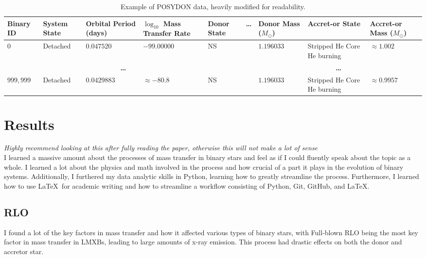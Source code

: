 \documentclass[12pt, a4paper]{article}
\begin{document}
    \begin{table}[H]
        \footnotesize
            \centering
            \begin{tabularx}{\textwidth}{||X|X|X|X|X||X||X|X|X||}
                \hline 
                \textbf{Binary ID} & 
                \textbf{System State} & 
                \textbf{Orbital Period (days)} & 
                \textbf{$\log_{10}$ Mass Transfer Rate} & 
                \textbf{Donor State} & 
                \textbf{\ldots}&
                \textbf{Donor Mass} ($M_\odot$) & 
                \textbf{Accret-or State} & 
                \textbf{Accret-or Mass} ($M_\odot$) \\
                \hline \hline
                $0$ & Detached & $0.047520$ & $-99.00000$ & NS & & $1.196033$ & Stripped He Core He burning & $\approx 1.002$ \\
                \hline
                \multicolumn{5}{||c||}{\textbf{\ldots}} & & \multicolumn{3}{c||}{\textbf{\ldots}}\\
                \hline
                $999,999$ & Detached & $0.0429883$ & $\approx -80.8$ & NS & & $1.196033$ & Stripped He Core He burning & $\approx 0.9957$ \\
                \hline
            \end{tabularx}
            \caption{Example of POSYDON data, heavily modified for readability.}
            \label{POSYDONDataExample}
        \end{table}
        


\section{Results}
    \textit{Highly recommend looking at this after fully reading the paper, otherwise this will not make a lot of sense}\\
    I learned a massive amount about the processes of mass transfer in binary stars and feel as if I could fluently speak about the topic as a whole. I learned a lot about the physics and math involved in the process and how crucial of a part it plays in the evolution of binary systems. Additionally, I furthered my data analytic skills in Python, learning how to greatly streamline the process. Furthermore, I learned how to use \LaTeX~for academic writing and how to streamline a workflow consisting of Python, Git, GitHub, and \LaTeX.
    \subsection{RLO}
    I found a lot of the key factors in mass transfer and how it affected various types of binary stars, with Full-blown RLO being the most key factor in mass transfer in LMXBs, leading to large amounts of x-ray emission. This process had drastic effects on both the donor and accretor star.
\end{document}
